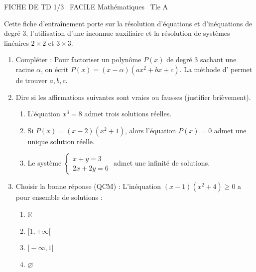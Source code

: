 \documentclass[11pt]{article}
\begin{document}
\begin{tcolorbox}[enhanced,colback=popink,colframe=popink,arc=10pt,boxrule=0pt,left=12pt,right=12pt,top=9pt,bottom=9pt]
{\color{white}\popxbold\small FICHE DE TD 1/3 \textbullet\ FACILE \hfill Mathématiques \textbullet\ Tle A\par}
\end{tcolorbox}
\vspace{4pt}
\noindent Cette fiche d'entraînement porte sur la résolution d'équations et d'inéquations de degré 3, l'utilisation d'une inconnue auxiliaire et la résolution de systèmes linéaires $2\times2$ et $3\times3$.

\begin{exercice}
\begin{enumerate}
    \item Compléter : Pour factoriser un polynôme $P(x)$ de degré 3 sachant une racine $\alpha$, on écrit $P(x) = (x-\alpha)(ax^2+bx+c)$. La méthode d'\underline{\hspace{4cm}} permet de trouver $a,b,c$.
    \item Dire si les affirmations suivantes sont vraies ou fausses (justifier brièvement).
    \begin{enumerate}
        \item L'équation $x^3 = 8$ admet trois solutions réelles.
        \item Si $P(x) = (x-2)(x^2+1)$, alors l'équation $P(x)=0$ admet une unique solution réelle.
        \item Le système $\begin{cases} x+y=3 \\ 2x+2y=6 \end{cases}$ admet une infinité de solutions.
    \end{enumerate}
    \item Choisir la bonne réponse (QCM) : L'inéquation $(x-1)(x^2+4) \ge 0$ a pour ensemble de solutions :
    \begin{enumerate}
        \item $\mathbb{R}$ \quad \item $[1, +\infty[$ \quad \item $]-\infty, 1]$ \quad \item $\varnothing$
    \end{enumerate}
\end{enumerate}
\end{exercice}
\end{document}
